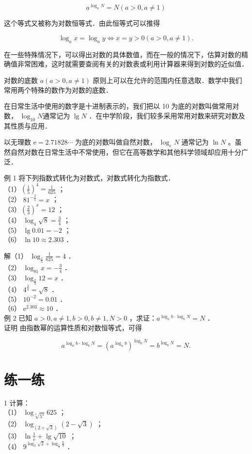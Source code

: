 \documentclass[10pt]{article}
\begin{document}
\[
a^{\log _{a} N}=N(a>0, a \neq 1)
\]

这个等式又被称为对数恒等式．由此恒等式可以推得

\[
\log _{a} x=\log _{a} y \Leftrightarrow x=y>0(a>0, a \neq 1) .
\]

在一些特殊情况下，可以得出对数的具体数值，而在一般的情况下，估算对数的精确值非常困难，这时就需要查阅有关的对数表或利用计算器来得到对数的近似值．

对数的底数 \(a(a>0, a \neq 1)\) 原则上可以在允许的范围内任意选取．数学中我们常用两个特殊的数作为对数的底数．

在日常生活中使用的数字是十进制表示的，我们把以 10 为底的对数叫做常用对数， \(\log _{10} N\)通常记为 \(\lg N\) ．在中学阶段，我们较多采用常用对数来研究对数及其性质与应用．

以无理数 \(\mathrm{e}=2.71828 \cdots\) 为底的对数叫做自然对数， \(\log _{e} N\) 通常记为 \(\ln N\) 。虽然自然对数在日常生活中不常使用，但它在高等数学和其他科学领域却应用十分广泛．

例 1 将下列指数式转化为对数式，对数式转化为指数式．\\
（1）\(\left(\frac{1}{5}\right)^{4}=\frac{1}{625}\) ；\\
（2） \(81^{-\frac{3}{4}}=x\) ；\\
（3）\(\left(\frac{2}{3}\right)^{x}=12\) ；\\
（4） \(\log _{4} \sqrt{8}=\frac{3}{4}\) ；\\
（5） \(\lg 0.01=-2\) ；\\
（6） \(\ln 10 \approx 2.303\) ．

解（1） \(\log _{\frac{1}{5}} \frac{1}{625}=4\) ．\\
（2） \(\log _{81} x=-\frac{3}{4}\) ．\\
（3） \(\log _{\frac{2}{3}} 12=x\) ．\\
（4） \(4^{\frac{3}{4}}=\sqrt{8}\) ．\\
（5） \(10^{-2}=0.01\) ．\\
（6） \(\mathrm{e}^{2.303} \approx 10\) ．\\
例 2 已知 \(a>0, a \neq 1, b>0, b \neq 1, N>0\) ，求证：\(a^{\log _{a} b \cdot \log _{b} N}=N\) ．\\
证明 由指数幂的运算性质和对数恒等式，可得

\[
a^{\log _{a} b \cdot \log _{b} N}=\left(a^{\log _{a} b}\right)^{\log _{b} N}=b^{\log _{b} N}=N .
\]

\section*{练一练}
1 计算：\\
（1） \(\log _{\sqrt[3]{5^{4}}} 625\) ；\\
（2） \(\log _{(2+\sqrt{3})}(2-\sqrt{3})\) ；\\
（3） \(\ln \frac{1}{\mathrm{e}}+\lg \sqrt{10}\) ；\\
（4） \(9^{\log _{3} \sqrt{2}+\log _{\frac{1}{9}} \frac{8}{9}}\) ．
\end{document}
